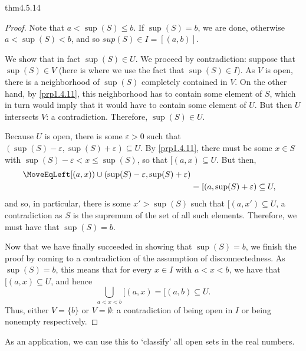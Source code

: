 \begin{thm}{}{thm4.5.14}
\begin{proof}
Note that $a<\sup (S)\leq b$.  If $\sup (S)=b$, we are done, otherwise $a<\sup (S)<b$, and so $sup (S)\in I=[(a,b)]$.

We show that in fact $\sup (S)\in U$.  We proceed by contradiction:  suppose that $\sup (S)\in V$ (here is where we use the fact that $\sup (S)\in I$).  As $V$ is open, there is a neighborhood of $\sup (S)$ completely contained in $V$.  On the other hand, by \cref{prp1.4.11}, this neighborhood has to contain some element of $S$, which in turn would imply that it would have to contain some element of $U$.  But then $U$ intersects $V$:  a contradiction.  Therefore, $\sup (S)\in U$.

Because $U$ is open, there is some $\varepsilon >0$ such that $(\sup (S)-\varepsilon ,\sup (S)+\varepsilon )\subseteq U$.  By \cref{prp1.4.11}, there must be some $x\in S$ with $\sup (S)-\varepsilon <x\leq \sup (S)$, so that $[(a,x)\subseteq U$.  But then,
\begin{equation}
\begin{split}
\MoveEqLeft
[(a,x))\cup (\sup (S)-\varepsilon ,\sup (S)+\varepsilon ) \\
& =[(a,\sup (S)+\varepsilon )\subseteq U,
\end{split}
\end{equation}
and so, in particular, there is some $x'>\sup (S)$ such that $[(a,x')\subseteq U$,  a contradiction as $S$ is the supremum of the set of all such elements.  Therefore, we must have that $\sup (S)=b$.

Now that we have finally succeeded in showing that $\sup (S)=b$, we finish the proof by coming to a contradiction of the assumption of disconnectedness.  As $\sup (S)=b$, this means that for every $x\in I$ with $a<x<b$, we have that $[(a,x)\subseteq U$, and hence
\begin{equation}
\bigcup _{a<x<b}[(a,x)=[(a,b)\subseteq U.
\end{equation}
Thus, either $V=\{ b\}$ or $V=\emptyset$:  a contradiction of being open in $I$ or being nonempty respectively.
\end{proof}
\end{thm}
As an application, we can use this to `classify' all open sets in the real numbers.
